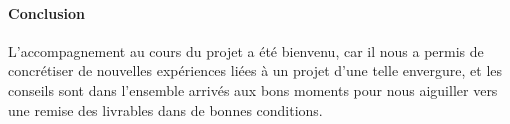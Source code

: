 \documentclass[a4paper]{article}
\begin{document}
\paragraph{Conclusion}

L'accompagnement au cours du projet a été bienvenu, car il nous a permis de concrétiser de nouvelles expériences liées à un projet d'une telle envergure, et les conseils sont dans l'ensemble arrivés aux bons moments pour nous aiguiller vers une remise des livrables dans de bonnes conditions.
\end{document}
